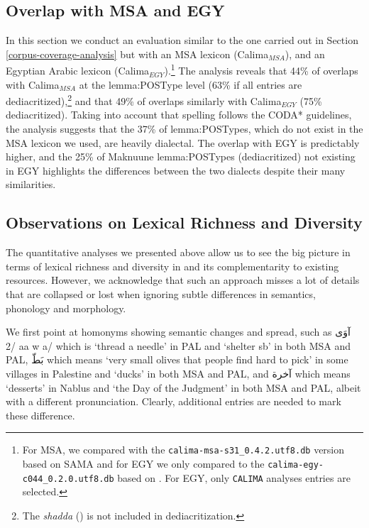 \subsection*{Overlap with MSA and EGY}
In this section we conduct an evaluation similar to the one carried out in Section \ref{corpus-coverage-analysis} but with an MSA lexicon (Calima$_{MSA}$), and an Egyptian Arabic lexicon (Calima$_{EGY}$).\footnote{For MSA, we compared with the \texttt{calima-msa-s31\_0.4.2.utf8.db} version \citep{Taji:2018:arabic-morphological} based on SAMA \citep{Graff:2009:standard} and for EGY we only compared to the {\tt calima-egy-c044\_0.2.0.utf8.db} based on \citep{Habash:2012:morphological}. For EGY, only {\tt CALIMA} analyses entries are selected.}
%
The analysis reveals that 44\% of \maknuune overlaps with Calima$_{MSA}$ at the lemma:POSType level (63\% if all entries are dediacritized),\footnote{The \textit{shadda} ({\SHADDA}) is not included in dediacritization.}
and that 49\% of \maknuune overlaps similarly with Calima$_{EGY}$ (75\% dediacritized). 
%
Taking into account that {\maknuune} spelling follows the CODA* guidelines,
the analysis suggests that the 37\% of {\maknuune}  lemma:POSTypes, which do not exist in the MSA lexicon we used, are heavily dialectal. The overlap with EGY is predictably higher, and the 25\% of Maknuune lemma:POSTypes (dediacritized) not existing in EGY highlights the differences between the two dialects despite their many similarities.

\subsection*{Observations on Lexical Richness and Diversity}
The quantitative analyses we presented above allow us to see the big picture in terms of lexical richness and diversity in {\maknuune} and its complementarity to existing resources. However, we acknowledge that such an approach misses a lot of details that are collapsed or lost when ignoring subtle differences in semantics, phonology and morphology.

We first point at homonyms showing semantic changes and spread, such as  \foreignlanguage{arabic}{آوَى} 
/2 aa w a/ which is  `thread a needle' in PAL and ‘shelter sb’ in both MSA and PAL,
\foreignlanguage{arabic}{بَطّ}  which means `very small olives that people find hard to pick' in some villages in Palestine and `ducks' in both MSA and PAL, and \foreignlanguage{arabic}{آخرة}
 which means `desserts' in Nablus and `the Day of the Judgment' in both MSA and PAL, albeit with a different pronunciation. Clearly, additional entries are needed to mark these difference.

